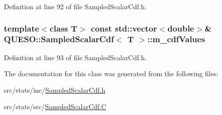 Definition at line 92 of file Sampled\-Scalar\-Cdf.\-h.

\hypertarget{class_q_u_e_s_o_1_1_sampled_scalar_cdf_ab8cf649637f31cc75c9f676d5927c10f}{
\subsubsection[{m\-\_\-cdf\-Values}]{\setlength{\rightskip}{0pt plus 5cm}template$<$class T$>$ const std\-::vector$<$double$>$\& {\bf Q\-U\-E\-S\-O\-::\-Sampled\-Scalar\-Cdf}$<$ T $>$\-::m\-\_\-cdf\-Values\hspace{0.3cm}{\ttfamily [protected]}}}\label{class_q_u_e_s_o_1_1_sampled_scalar_cdf_ab8cf649637f31cc75c9f676d5927c10f}


Definition at line 93 of file Sampled\-Scalar\-Cdf.\-h.



The documentation for this class was generated from the following files\-:\begin{DoxyCompactItemize}
\item 
src/stats/inc/\hyperlink{_sampled_scalar_cdf_8h}{Sampled\-Scalar\-Cdf.\-h}\item 
src/stats/src/\hyperlink{_sampled_scalar_cdf_8_c}{Sampled\-Scalar\-Cdf.\-C}\end{DoxyCompactItemize}
